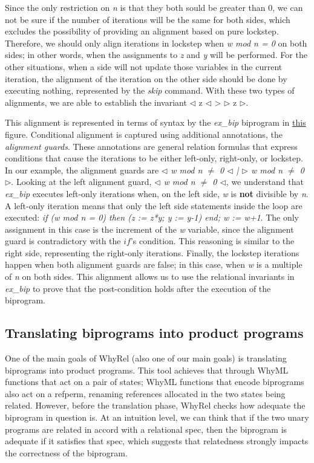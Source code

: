 Since the only restriction on \emph{n} is that they both sould be greater than 0, we can not be sure if the number of iterations will be the same for both sides, which excludes the possibility of providing an alignment based on pure lockstep.
Therefore, we should only align iterations in lockstep when \emph{w mod n = 0} on both sides; in other words, when the assignments to \emph{z} and \emph{y} will be performed.
For the other situations, when a side will not update those variables in the current iteration, the alignment of the iteration on the other side should be done by executing nothing, represented by the \emph{skip} command.
With these two types of alignments, we are able to establish the invariant $\lhd$ z $\lhd$ > $\rhd$ z $\rhd$.

This alignment is represented in terms of syntax by the \emph{ex\_bip} biprogram in \hyperref[fig:cond_align_loops_ex]{this} figure.
Conditional alignment is captured using additional annotations, the \emph{alignment guards}.
These annotations are general relation formulas that express conditions that cause the iterations to be either left-only, right-only, or lockstep.
In our example, the alignment guards are \emph{$\lhd$ w mod n $\neq$ 0 $\lhd$ | $\rhd$ w mod n $\neq$ 0 $\rhd$}.
Looking at the left alignment guard, \emph{$\lhd$ w mod n $\neq$ 0 $\lhd$}, we understand that \emph{ex\_bip} executes left-only iterations when, on the left side, \emph{w} is \textbf{not} divisible by \emph{n}. 
A left-only iteration means that only the left side statements inside the loop are executed: \emph{if (w mod n = 0) then (z := z*y; y := y-1) end; w := w+1}.
The only assignment in this case is the increment of the \emph{w} variable, since the alignment guard is contradictory with the $if$'s condition.
This reasoning is similar to the right side, representing the right-only iterations.
Finally, the lockstep iterations happen when both alignment guards are false; in this case, when \emph{w} is a multiple of \emph{n} on both sides.
This alignment allows us to use the relational invariants in \emph{ex\_bip} to prove that the post-condition holds after the execution of the biprogram.


\FloatBarrier
\subsection{Translating biprograms into product programs}
\label{subsec:whyrel_translation}

One of the main goals of WhyRel (also one of our main goals) is translating biprograms into product programs.
This tool achieves that through WhyML functions that act on a pair of states; WhyML functions that encode biprograms also act on a refperm, renaming references allocated in the two states being related.
However, before the translation phase, WhyRel checks how adequate the biprogram in question is.
At an intuition level, we can think that if the two unary programs are related in accord with a relational spec, then the biprogram is adequate if it satisfies that spec, which suggests that relatedness strongly impacts the correctness of the biprogram.

